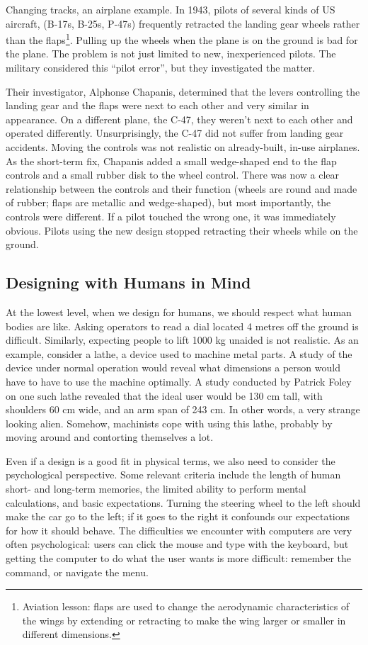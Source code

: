 Changing tracks, an airplane example. In 1943, pilots of several kinds of US aircraft, (B-17s, B-25s, P-47s) frequently retracted the landing gear wheels rather than the flaps\footnote{Aviation lesson: flaps are used to change the aerodynamic characteristics of the wings by extending or retracting to make the wing larger or smaller in different dimensions.}. Pulling up the wheels when the plane is on the ground is bad for the plane. The problem is not just limited to new, inexperienced pilots. The military considered this ``pilot error'', but they investigated the matter.

Their investigator, Alphonse Chapanis, determined that the levers controlling the landing gear and the flaps were next to each other and very similar in appearance. On a different plane, the C-47, they weren't next to each other and operated differently. Unsurprisingly, the C-47 did not suffer from landing gear accidents. Moving the controls was not realistic on already-built, in-use airplanes. As the short-term fix, Chapanis added a small wedge-shaped end to the flap controls and a small rubber disk to the wheel control. There was now a clear relationship between the controls and their function (wheels are round and made of rubber; flaps are metallic and wedge-shaped), but most importantly, the controls were different. If a pilot touched the wrong one, it was immediately obvious. Pilots using the new design stopped retracting their wheels while on the ground.


\subsection*{Designing with Humans in Mind}
At the lowest level, when we design for humans, we should respect what human bodies are like. Asking operators to read a dial located 4 metres off the ground is difficult. Similarly, expecting people to lift 1000 kg unaided is not realistic. As an example, consider a lathe, a device used to machine metal parts. A study of the device under normal operation would reveal what dimensions a person would have to have to use the machine optimally. A study conducted by Patrick Foley on one such lathe revealed that the ideal user would be 130 cm tall, with shoulders 60 cm wide, and an arm span of 243 cm. In other words, a very strange looking alien. Somehow, machinists cope with using this lathe, probably by moving around and contorting themselves a lot. 

Even if a design is a good fit in physical terms, we also need to consider the psychological perspective. Some relevant criteria include the length of human short- and long-term memories, the limited ability to perform mental calculations, and basic expectations. Turning the steering wheel to the left should make the car go to the left; if it goes to the right it confounds our expectations for how it should behave. The difficulties we encounter with computers are very often psychological: users can click the mouse and type with the keyboard, but getting the computer to do what the user wants is more difficult: remember the command, or navigate the menu.

